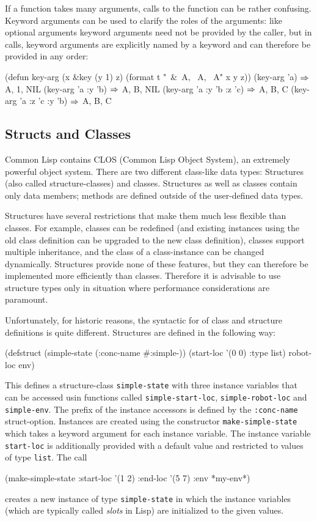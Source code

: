 \documentclass[a4paper]{amsart}
\begin{document}
If a function takes many arguments, calls to the function can be
rather confusing.  Keyword arguments can be used to clarify the roles
of the arguments: like optional arguments keyword arguments need not
be provided by the caller, but in calls, keyword arguments are
explicitly named by a keyword and can therefore be provided in any
order:
\begin{Code}
  (defun key-arg (x &key (y 1) z)
    (format t "~&~A, ~A, ~A" x y z))
  (key-arg 'a)                    $\Rightarrow$ A, 1, NIL
  (key-arg 'a :y 'b)              $\Rightarrow$ A, B, NIL 
  (key-arg 'a :y 'b :z 'c)        $\Rightarrow$ A, B, C 
  (key-arg 'a :z 'c :y 'b)        $\Rightarrow$ A, B, C 
\end{Code}

\subsection{Structs and Classes}
\label{sec:structs-classes}

Common Lisp contains CLOS (Common Lisp Object System), an extremely
powerful object system.  There are two different class-like data
types: Structures (also called structure-classes) and classes.
Structures as well as classes contain only data members; methods are
defined outside of the user-defined data types.

Structures have several restrictions that make them much less flexible
than classes.  For example, classes can be redefined (and existing
instances using the old class definition can be upgraded to the new
class definition), classes support multiple inheritance, and the class
of a class-instance can be changed dynamically.  Structures provide
none of these features, but they can therefore be implemented more
efficiently than classes.  Therefore it is advisable to use structure
types only in situation where performance considerations are
paramount.

Unfortunately, for historic reasons, the syntactic for of class and
structure definitions is quite different.  Structures are defined in
the following way:
\begin{Code}
  (defstruct (simple-state (:conc-name #:simple-))
    (start-loc '(0 0) :type list)
    robot-loc
    env)  
\end{Code}
This defines a structure-class \texttt{simple-state} with three
instance variables that can be accessed usin functions called
\texttt{simple-start-loc}, \texttt{simple-robot-loc} and
\texttt{simple-env}.  The prefix of the instance accessors is defined
by the \texttt{:conc-name} struct-option.  Instances are created using
the constructor \texttt{make-simple-state} which takes a keyword
argument for each instance variable.  The instance variable
\texttt{start-loc} is additionally provided with a default value and
restricted to values of type \texttt{list}.  The call
\begin{Code}
  (make-simple-state :start-loc '(1 2) :end-loc '(5 7) :env *my-env*)
\end{Code}
creates a new instance of type \texttt{simple-state} in which the
instance variables (which are typically called \emph{slots} in Lisp)
are initialized to the given values.
\end{document}
